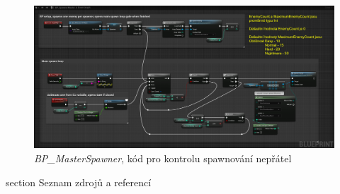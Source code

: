 \documentclass[12pt,a4paper,hidelinks]{article}
\begin{document}
\begin{figure}[h!]
	\centering
	\includegraphics[width=1.0\textwidth]{images/masterspawner.png}
	\caption{\textit{BP{\_}MasterSpawner}, kód pro kontrolu spawnování nepřátel}
	\label{masterspawner}
\end{figure}
\clearpage


\printbibliography[title={Seznam zdrojů a referencí}]
 {section} {Seznam zdrojů a referencí}
\end{document}
